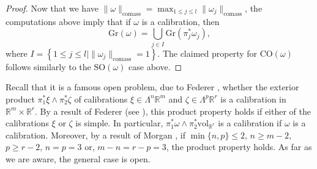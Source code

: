 \documentclass[a4paper,leqno,11pt]{amsart}
\numberwithin{equation}{section}
\theoremstyle{remark}
\theoremstyle{remark}
\newcommand{\R}{\mathbb{R}}
\newcommand{\vol}{\mathrm{vol}}
\newcommand{\comass}{\mathrm{comass}}
\newcommand{\Gr}{\mathrm{Gr}}
\newcommand{\SO}{\mathrm{SO}}
\newcommand{\CO}{\mathrm{CO}}
\begin{document}
\begin{proof}
Now that we have $\|\omega\|_{\comass} = \max_{ 1 \leq j \leq l } \| \omega_j \|_{\comass}$, the computations above imply that if $\omega$ is a calibration, then
\begin{equation*}
    \Gr( \omega ) = \bigcup_{ j \in I } \Gr( \pi_j^* \omega_j ),
\end{equation*}
where $I = \left\{ 1 \leq j \leq l \mid \| \omega_j \|_{\comass} = 1 \right\}$. The claimed property for $\CO( \omega )$ follows similarly to the $\SO(\omega)$ case above.
\end{proof}


Recall that it is a famous open problem, due to Federer \cite[1.8.4]{Fed:69}, whether the exterior product $\pi_1^*\xi \wedge \pi_2^*\zeta$ of calibrations $\xi\in \Lambda^n \R^m$ and $\zeta\in \Lambda^p \R^r$ is a calibration in $\mathbb{R}^m \times \mathbb{R}^r$. By a result of Federer (see \cite[1.8.4]{Fed:69}), this product property holds if either of the calibrations $\xi$ or $\zeta$ is simple. In particular, $\pi_1^*\omega \wedge \pi_2^*\vol_{\R^r}$ is a calibration if $\omega$ is a calibration. Moreover, by a result of Morgan \cite[Theorem 5.1]{Mor:85}, if $\min\{n,p\} \le 2$, $n\ge m-2$, $p\ge r-2$, $n=p=3$ or, $m-n = r-p = 3$, the product property holds. As far as we are aware, the general case is open.
\end{document}
